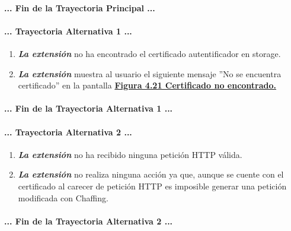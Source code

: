 \documentclass[12pt, a4paper, titlepage]{report}
\begin{document}
				\paragraph{... Fin de la Trayectoria Principal ...}
				
				\paragraph{... Trayectoria Alternativa 1 ...}
				\begin{enumerate}
				    \item \textbf{\textit{La extensión}} no ha encontrado el certificado autentificador en storage.
					\item \textbf{\textit{La extensión}} muestra al usuario el siguiente mensaje ''No se encuentra certificado'' en la pantalla \hyperref[UI_certNotFound]{\textbf{Figura 4.21 Certificado no encontrado.}}
				\end{enumerate}
				\paragraph{... Fin de la Trayectoria Alternativa 1 ...}
				
					\paragraph{... Trayectoria Alternativa 2 ...}
				\begin{enumerate}
				    \item \textbf{\textit{La extensión}} no ha recibido ninguna petición HTTP válida.
					\item \textbf{\textit{La extensión}} no realiza ninguna acción ya que, aunque se cuente con el certificado al carecer de petición HTTP es imposible generar una petición modificada con Chaffing.
				\end{enumerate}
				\paragraph{... Fin de la Trayectoria Alternativa 2 ...}
				
				\newpage
			
\end{document}
